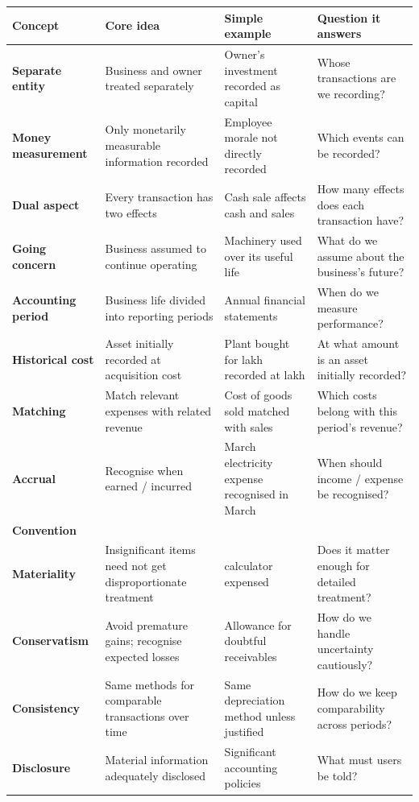 \documentclass[11pt,a4paper]{article}
\newcommand{\Rs}{\ifmmode\text{\rsfont ₹}\else{\rsfont ₹}\fi}
\begin{document}
\begin{center}
\small
\begin{tabularx}{\textwidth}{@{}l Y Y Y@{}}
\toprule
{}\textbf{Concept} & \textbf{Core idea} & \textbf{Simple example} & \textbf{Question it answers}\\
\midrule
\textbf{Separate entity} & Business and owner treated separately & Owner's investment recorded as capital & Whose transactions are we recording?\\
\textbf{Money measurement} & Only monetarily measurable information recorded & Employee morale not directly recorded & Which events can be recorded?\\
\textbf{Dual aspect} & Every transaction has two effects & Cash sale affects cash and sales & How many effects does each transaction have?\\
\textbf{Going concern} & Business assumed to continue operating & Machinery used over its useful life & What do we assume about the business's future?\\
\textbf{Accounting period} & Business life divided into reporting periods & Annual financial statements & When do we measure performance?\\
\textbf{Historical cost} & Asset initially recorded at acquisition cost & Plant bought for \Rs 5 lakh recorded at \Rs 5 lakh & At what amount is an asset initially recorded?\\
\textbf{Matching} & Match relevant expenses with related revenue & Cost of goods sold matched with sales & Which costs belong with this period's revenue?\\
\textbf{Accrual} & Recognise when earned / incurred & March electricity expense recognised in March & When should income / expense be recognised?\\
\midrule
{}\textbf{Convention} & & &\\
\textbf{Materiality} & Insignificant items need not get disproportionate treatment & \Rs 100 calculator expensed & Does it matter enough for detailed treatment?\\
\textbf{Conservatism} & Avoid premature gains; recognise expected losses & Allowance for doubtful receivables & How do we handle uncertainty cautiously?\\
\textbf{Consistency} & Same methods for comparable transactions over time & Same depreciation method unless justified & How do we keep comparability across periods?\\
\textbf{Disclosure} & Material information adequately disclosed & Significant accounting policies & What must users be told?\\
\bottomrule
\end{tabularx}
\end{center}
\end{document}
